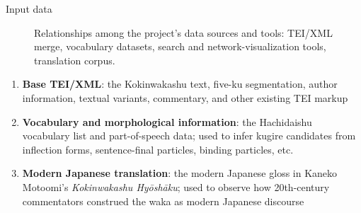 \begin{block}{Input data}

\begin{figure}[H]\centering

\setcounter{figure}{4}
\caption{Relationships among the project's data sources and tools: TEI/XML merge,
vocabulary datasets, search and network-visualization tools, translation corpus.}
\end{figure}

\begin{enumerate}
\item \textbf{Base TEI/XML}: the Kokinwakashu text, five-ku segmentation, author
  information, textual variants, commentary, and other existing TEI markup
\item \textbf{Vocabulary and morphological information}: the Hachidaishu vocabulary
  list and part-of-speech data; used to infer kugire candidates from inflection
  forms, sentence-final particles, binding particles, etc.
\item \textbf{Modern Japanese translation}: the modern Japanese gloss in Kaneko
  Motoomi's \textit{Kokinwakashu Hy\=osh\=aku}; used to observe how 20th-century
  commentators construed the waka as modern Japanese discourse
\end{enumerate}
\end{block}

